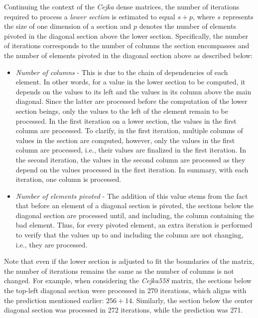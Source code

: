 Continuing the context of the \textit{Cejka} dense matrices, the number of iterations required to process a \textit{lower section} is estimated to equal $s + p$, where $s$ represents the size of one dimension of a section and $p$ denotes the number of elements pivoted in the diagonal section above the lower section. Specifically, the number of iterations corresponds to the number of columns the section encompasses and the number of elements pivoted in the diagonal section above as described below:

\begin{itemize}
	\itemsep=0em %
	\item \textit{Number of columns} - This is due to the chain of dependencies of each element. In other words, for a value in the lower section to be computed, it depends on the values to its left and the values in its column above the main diagonal. Since the latter are processed before the computation of the lower section beings, only the values to the left of the element remain to be processed. In the first iteration on a lower section, the values in the first column are processed. To clarify, in the first iteration, multiple columns of values in the section are computed, however, only the values in the first column are processed, i.e., their values are finalized in the first iteration. In the second iteration, the values in the second column are processed as they depend on the values processed in the first iteration. In summary, with each iteration, one column is processed.
	\item \textit{Number of elements pivoted} - The addition of this value stems from the fact that before an element of a diagonal section is pivoted, the sections below the diagonal section are processed until, and including, the column containing the bad element. Thus, for every pivoted element, an extra iteration is performed to verify that the values up to and including the column are not changing, i.e., they are processed.
\end{itemize}

Note that even if the lower section is adjusted to fit the boundaries of the matrix, the number of iterations remains the same as the number of columns is not changed. For example, when considering the \textit{Cejka558} matrix, the sections below the top-left diagonal section were processed in 270 iterations, which aligns with the prediction mentioned earlier: $256 + 14$. Similarly, the section below the center diagonal section was processed in 272 iterations, while the prediction was 271.

